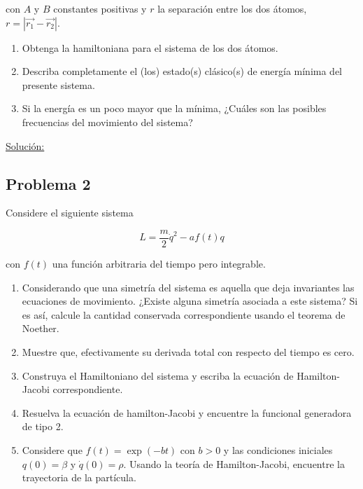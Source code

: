 \documentclass[a4paper,10pt]{article}
\numberwithin{equation}{section}
\begin{document}
con $A$ y $B$ constantes positivas y $r$ la separación entre los dos átomos, $r = |\overrightarrow{r_1} 
- \overrightarrow{r_2}|$.

\begin{enumerate}[label=\alph*)]
 \item Obtenga la hamiltoniana para el sistema de los dos átomos.
 \item Describa completamente el (los) estado(s) clásico(s) de energía mínima del presente 
 sistema.
 \item Si la energía es un poco mayor que la mínima, ¿Cuáles son las posibles frecuencias 
 del movimiento del sistema?
\end{enumerate}

\vspace{.3cm}

\underline{Solución:} \vspace{.3cm}

\subsection{Problema 2}

Considere el siguiente sistema 

$$
L = \frac{m}{2}\dot{q}^2 - af(t)q
$$

con $f(t)$ una función arbitraria del tiempo pero integrable.

\begin{enumerate}[label=\alph*)]
 \item Considerando que una simetría del sistema es aquella que deja invariantes las 
 ecuaciones de movimiento. ¿Existe alguna simetría asociada a este sistema? Si es así,
 calcule la cantidad conservada correspondiente usando el teorema de Noether.
 \item Muestre que, efectivamente su derivada total con respecto del tiempo es cero.
 \item Construya el Hamiltoniano del sistema y escriba la ecuación de Hamilton-Jacobi 
 correspondiente.
 \item Resuelva la ecuación de hamilton-Jacobi y encuentre la funcional generadora de 
 tipo 2.
 \item Considere que $f(t) = \exp{(-bt)}$ con $b > 0$ y las condiciones iniciales
 $q(0) = \beta$ y $\dot{q}(0) = \rho$. Usando la teoría de Hamilton-Jacobi, encuentre 
 la trayectoria de la partícula.
\end{enumerate}

\vspace{.3cm}
\end{document}
